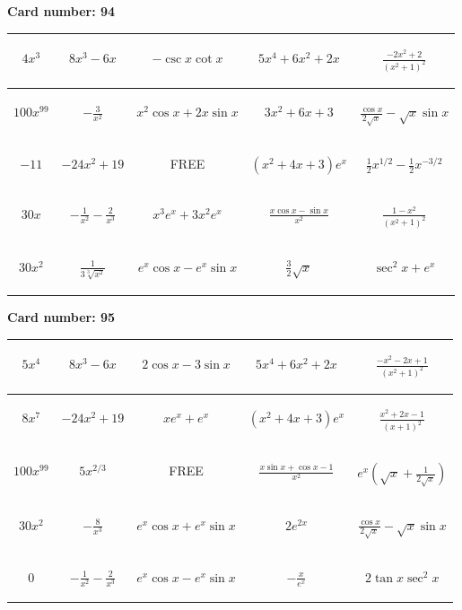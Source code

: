 \documentclass{article}
\newcommand{\entry}[1]{\begin{minipage}[t][2.75cm][t]{4cm} \vspace{1cm} \begin{center}#1\end{center} \end{minipage}}
\newcommand{\freespace}{\entry{FREE}}
\newcommand{\cardnumber}[1]{\noindent \textbf{Card number: #1} \bigskip}
\begin{document}
\pagebreak

\cardnumber{94}
\begin{center}
\begin{tabular}{|*{5}{c|}}
    \hline
    \entry{$4x^3$} & \entry{$8x^3 - 6x$} & \entry{$-\csc x \cot x$} & \entry{$5x^4 + 6x^2 + 2x$} & \entry{$\frac{-2x^2 + 2}{(x^2 + 1)^2}$} \\ \hline
    \entry{$100x^{99}$} & \entry{$-\frac{3}{x^2}$} & \entry{$x^2 \cos x + 2x \sin x$} & \entry{$3x^2 + 6x + 3$} & \entry{$\frac{\cos x}{2 \sqrt{x}} - \sqrt{x} \sin x$} \\ \hline
    \entry{$-11$} & \entry{$-24x^2 + 19$} & \freespace & \entry{$(x^2 + 4x + 3) e^x$} & \entry{$\frac{1}{2} x^{1/2} - \frac{1}{2} x^{-3/2}$} \\ \hline
    \entry{$30x$} & \entry{$-\frac{1}{x^2} - \frac{2}{x^3}$} & \entry{$x^3 e^x + 3x^2 e^x$} & \entry{$\frac{x \cos x - \sin x}{x^2}$} & \entry{$\frac{1 - x^2}{(x^2 + 1)^2}$} \\ \hline
    \entry{$30x^2$} & \entry{$\frac{1}{3\sqrt[3]{x^2}}$} & \entry{$e^x \cos x - e^x \sin x$} & \entry{$\frac{3}{2} \sqrt{x}$} & \entry{$\sec^2 x + e^x$} \\ \hline
\end{tabular}
\end{center}

\pagebreak

\cardnumber{95}
\begin{center}
\begin{tabular}{|*{5}{c|}}
    \hline
    \entry{$5x^4$} & \entry{$8x^3 - 6x$} & \entry{$2 \cos x - 3 \sin x$} & \entry{$5x^4 + 6x^2 + 2x$} & \entry{$\frac{-x^2 - 2x + 1}{(x^2 + 1)^2}$} \\ \hline
    \entry{$8x^7$} & \entry{$-24x^2 + 19$} & \entry{$x e^x + e^x$} & \entry{$(x^2 + 4x + 3) e^x$} & \entry{$\frac{x^2 + 2x - 1}{(x + 1)^2}$} \\ \hline
    \entry{$100x^{99}$} & \entry{$5x^{2/3}$} & \freespace & \entry{$\frac{x \sin x + \cos x - 1}{x^2}$} & \entry{$e^x \left(\sqrt{x} + \frac{1}{2\sqrt{x}}\right)$} \\ \hline
    \entry{$30x^2$} & \entry{$-\frac{8}{x^3}$} & \entry{$e^x \cos x + e^x \sin x$} & \entry{$2e^{2x}$} & \entry{$\frac{\cos x}{2 \sqrt{x}} - \sqrt{x} \sin x$} \\ \hline
    \entry{$0$} & \entry{$-\frac{1}{x^2} - \frac{2}{x^3}$} & \entry{$e^x \cos x - e^x \sin x$} & \entry{$-\frac{x}{e^x}$} & \entry{$2 \tan x \sec^2 x$} \\ \hline
\end{tabular}
\end{center}
\end{document}
